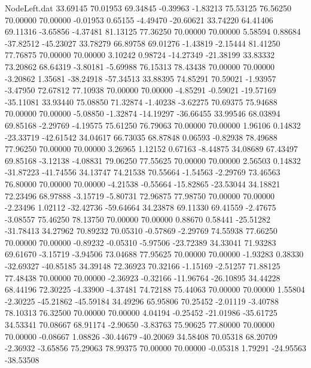 \begin{filecontents}{NodeLeft.dat}
  33.69145   70.01953   69.34845    -0.39963   -1.83213   75.53125   76.56250   70.00000   70.00000   -0.01953    0.65155   -4.49470  -20.60621
  33.74220   64.41406   69.11316    -3.65856   -4.37481   81.13125   77.36250   70.00000   70.00000    5.58594    0.88684  -37.82512  -45.23027
  33.78279   66.89758   69.01276    -1.43819   -2.15444   81.41250   77.76875   70.00000   70.00000    3.10242    0.98724  -14.27349  -21.38199
  33.83332   73.20862   68.64319    -3.80181   -5.69988   76.15313   78.43438   70.00000   70.00000   -3.20862    1.35681  -38.24918  -57.34513
  33.88395   74.85291   70.59021    -1.93957   -3.47950   72.67812   77.10938   70.00000   70.00000   -4.85291   -0.59021  -19.57169  -35.11081
  33.93440   75.08850   71.32874    -1.40238   -3.62275   70.69375   75.94688   70.00000   70.00000   -5.08850   -1.32874  -14.19297  -36.66455
  33.99546   68.03894   69.85168    -2.29769   -4.19575   75.61250   76.79063   70.00000   70.00000    1.96106    0.14832  -23.33719  -42.61542
  34.04617   66.73035   68.87848     0.06593   -0.82938   78.49688   77.96250   70.00000   70.00000    3.26965    1.12152    0.67163   -8.44875
  34.08689   67.43497   69.85168    -3.12138   -4.08831   79.06250   77.55625   70.00000   70.00000    2.56503    0.14832  -31.87223  -41.74556
  34.13747   74.21538   70.55664    -1.54563   -2.29769   73.46563   76.80000   70.00000   70.00000   -4.21538   -0.55664  -15.82865  -23.53044
  34.18821   72.23496   68.97888    -3.15719   -5.80731   72.96875   77.98750   70.00000   70.00000   -2.23496    1.02112  -32.42736  -59.64664
  34.23878   69.11330   69.41559    -2.47675   -3.08557   75.46250   78.13750   70.00000   70.00000    0.88670    0.58441  -25.51282  -31.78413
  34.27962   70.89232   70.05310    -0.57869   -2.29769   74.55938   77.66250   70.00000   70.00000   -0.89232   -0.05310   -5.97506  -23.72389
  34.33041   71.93283   69.61670    -3.15719   -3.94506   73.04688   77.95625   70.00000   70.00000   -1.93283    0.38330  -32.69327  -40.85185
  34.39148   72.36923   70.32166    -1.15169   -2.51257   71.88125   77.48438   70.00000   70.00000   -2.36923   -0.32166  -11.96764  -26.10895
  34.44228   68.44196   72.30225    -4.33900   -4.37481   74.72188   75.44063   70.00000   70.00000    1.55804   -2.30225  -45.21862  -45.59184
  34.49296   65.95806   70.25452    -2.01119   -3.40788   78.10313   76.32500   70.00000   70.00000    4.04194   -0.25452  -21.01986  -35.61725
  34.53341   70.08667   68.91174    -2.90650   -3.83763   75.90625   77.80000   70.00000   70.00000   -0.08667    1.08826  -30.44679  -40.20069
  34.58408   70.05318   68.20709    -2.36932   -3.65856   75.29063   78.99375   70.00000   70.00000   -0.05318    1.79291  -24.95563  -38.53508

\end{filecontents}

